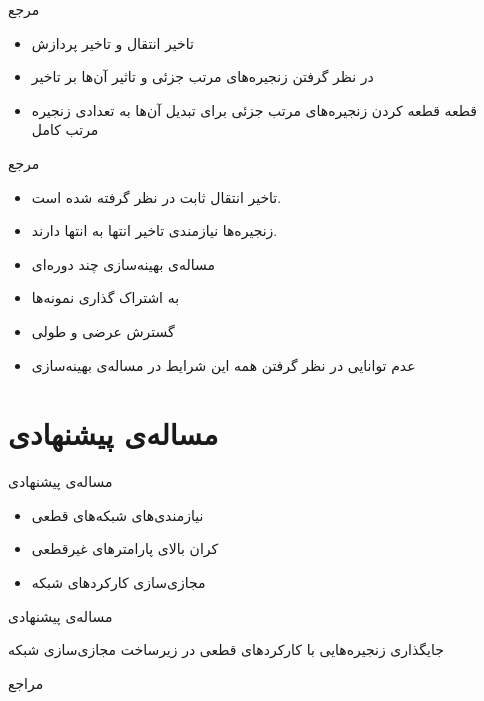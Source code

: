 \documentclass[dvipsnames]{beamer}
\makeatletter
\newcommand{\RTList}{\raggedleft\rightskip\@totalleftmargin}
\makeatother
\begin{document}
\begin{persian}
	\begin{frame}{مرجع~\cite{Yang2019}}
		\begin{itemize}\RTList{}
				\justifying%
				\item تاخیر انتقال و تاخیر پردازش
				\item در نظر گرفتن زنجیره‌های مرتب جزئی و تاثیر آن‌ها بر تاخیر
				\item قطعه قطعه کردن زنجیره‌های مرتب جزئی برای تبدیل آن‌ها به تعدادی زنجیره مرتب کامل
		\end{itemize}
	\end{frame}

	\begin{frame}{مرجع~\cite{Huang2019}}
		\begin{itemize}\RTList{}
				\justifying%
				\item تاخیر انتقال ثابت در نظر گرفته شده است.
				\item زنجیره‌ها نیازمندی تاخیر انتها به انتها دارند.
		  		\item مساله‌ی بهینه‌سازی چند دوره‌ای
				\item به اشتراک گذاری نمونه‌ها
				\item گسترش عرضی و طولی
				\item عدم توانایی در نظر گرفتن همه این شرایط در مساله‌ی بهینه‌سازی
		\end{itemize}
	\end{frame}

	\section{مساله‌ی پیشنهادی}

	\begin{frame}{مساله‌ی پیشنهادی}
		\begin{itemize}\RTList{}
				\justifying%
				\item نیازمندی‌های شبکه‌های قطعی
				\item کران بالای پارامترهای غیرقطعی
				\item مجازی‌سازی کارکردهای شبکه
		\end{itemize}
	\end{frame}

	\begin{frame}{مساله‌ی پیشنهادی}
		\begin{block}{}
			\centering
			جایگذاری زنجیره‌هایی با کارکردهای قطعی در زیرساخت مجازی‌سازی شبکه
		\end{block}
	\end{frame}

	\begin{frame}[allowframebreaks]{مراجع}
		\begin{latin}
		\printbibliography[title=مراجع]
		\end{latin}
	\end{frame}

\end{persian}
\end{document}

